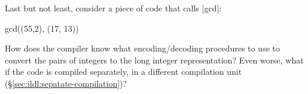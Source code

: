 Last but not least, consider a piece of code that calls |gcd|:

\begin{lstlisting-nobreak}
gcd((55,2), (17, 13))
\end{lstlisting-nobreak}

How does the compiler know what encoding/decoding procedures to use to convert the pairs of integers to the long integer representation? Even worse, what if the code is compiled separately, in a different compilation unit (\S\ref{sec:ildl:sepatate-compilation})?

